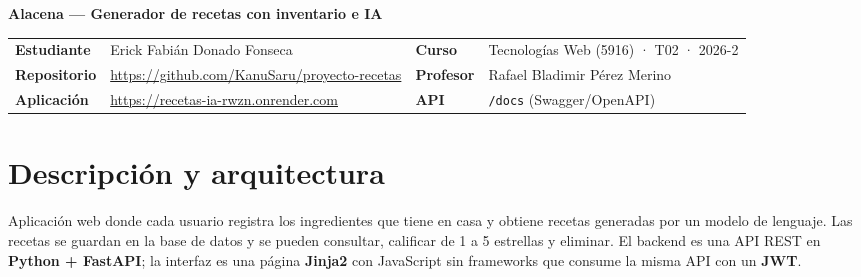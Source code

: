 \documentclass[10pt,a4paper]{article}
\newcommand{\code}[1]{\texttt{\small #1}}
\begin{document}
{\LARGE\bfseries Alacena — Generador de recetas con inventario e IA}\par\vspace{4pt}
{\small
\begin{tabularx}{\linewidth}{@{}l X l l@{}}
\textbf{Estudiante} & Erick Fabián Donado Fonseca & \textbf{Curso} & Tecnologías Web (5916) · T02 · 2026-2\\
\textbf{Repositorio} & \url{https://github.com/KanuSaru/proyecto-recetas} & \textbf{Profesor} & Rafael Bladimir Pérez Merino\\
\textbf{Aplicación} & \url{https://recetas-ia-rwzn.onrender.com} & \textbf{API} & \code{/docs} (Swagger/OpenAPI)\\
\end{tabularx}}

\section{Descripción y arquitectura}
Aplicación web donde cada usuario registra los ingredientes que tiene en casa y obtiene recetas generadas por un modelo de lenguaje. Las recetas se guardan en la base de datos y se pueden consultar, calificar de 1 a 5 estrellas y eliminar. El backend es una API REST en \textbf{Python + FastAPI}; la interfaz es una página \textbf{Jinja2} con JavaScript sin frameworks que consume la misma API con un \textbf{JWT}.
\end{document}
